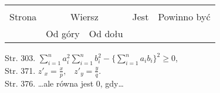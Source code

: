 \documentclass[a4paper,11pt]{article}
\begin{document}
\begin{center}
  \begin{tabular}{|c|c|c|c|c|}
    \hline
    & \multicolumn{2}{c|}{} & & \\
    Strona & \multicolumn{2}{c|}{Wiersz} & Jest
                              & Powinno być \\ \cline{2-3}
    & Od góry & Od dołu & & \\
    \hline
    \hline
  \end{tabular}

\end{center}

\vspace{\spaceTwo}


Str. 303.
$\displaystyle \sum_{ i = 1 }^{ n } a_{ i }^{2} \sum_{ i = 1 }^{ n } b_{ i }^{
  2 }
- \{ \sum_{ i = 1 }^{ n } a_{ i } b_{ i } \}^{ 2 } \geq 0$, \\
Str. 371. $\displaystyle z'_{ x } = \frac{ x }{ p }\textrm{,} \quad
z'_{ y } = \frac{ y }{ q }\textrm{.}$ \\
Str. 376. \ldots ale równa jest 0, gdy\ldots















\vspace{\spaceFour}
\end{document}
